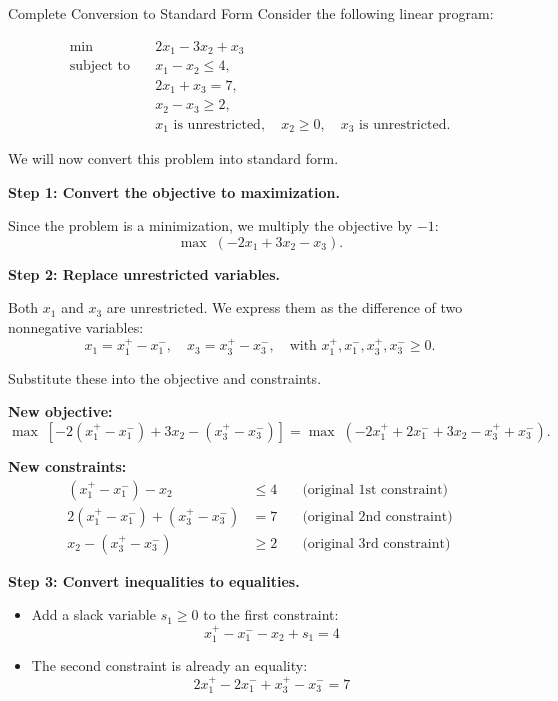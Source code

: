 \begin{example}{Complete Conversion to Standard Form}{}
Consider the following linear program:

\[
\begin{aligned}
\min \quad & 2x_1 - 3x_2 + x_3 \\
\text{subject to} \quad 
& x_1 - x_2 \leq 4, \\
& 2x_1 + x_3 = 7, \\
& x_2 - x_3 \geq 2, \\
& x_1 \text{ is unrestricted}, \quad x_2 \geq 0, \quad x_3 \text{ is unrestricted}.
\end{aligned}
\]

We will now convert this problem into standard form.

\medskip
\textbf{Step 1: Convert the objective to maximization.}

Since the problem is a minimization, we multiply the objective by \( -1 \):
\[
\max \; (-2x_1 + 3x_2 - x_3).
\]

\medskip
\textbf{Step 2: Replace unrestricted variables.}

Both \( x_1 \) and \( x_3 \) are unrestricted. We express them as the difference of two nonnegative variables:
\[
x_1 = x_1^+ - x_1^-, \quad x_3 = x_3^+ - x_3^-, \quad \text{with } x_1^+, x_1^-, x_3^+, x_3^- \geq 0.
\]

Substitute these into the objective and constraints.

\smallskip
\textbf{New objective:}
\[
\max \; [-2(x_1^+ - x_1^-) + 3x_2 - (x_3^+ - x_3^-)] = \max \; (-2x_1^+ + 2x_1^- + 3x_2 - x_3^+ + x_3^-).
\]

\smallskip
\textbf{New constraints:}
\begin{align*}
(x_1^+ - x_1^-) - x_2 &\leq 4 \quad &\text{(original 1st constraint)} \\
2(x_1^+ - x_1^-) + (x_3^+ - x_3^-) &= 7 \quad &\text{(original 2nd constraint)} \\
x_2 - (x_3^+ - x_3^-) &\geq 2 \quad &\text{(original 3rd constraint)}
\end{align*}

\medskip
\textbf{Step 3: Convert inequalities to equalities.}

\begin{itemize}
    \item Add a slack variable \( s_1 \geq 0 \) to the first constraint:
    \[
    x_1^+ - x_1^- - x_2 + s_1 = 4
    \]

    \item The second constraint is already an equality:
    \[
    2x_1^+ - 2x_1^- + x_3^+ - x_3^- = 7
    \]


\end{itemize}
\end{example}

